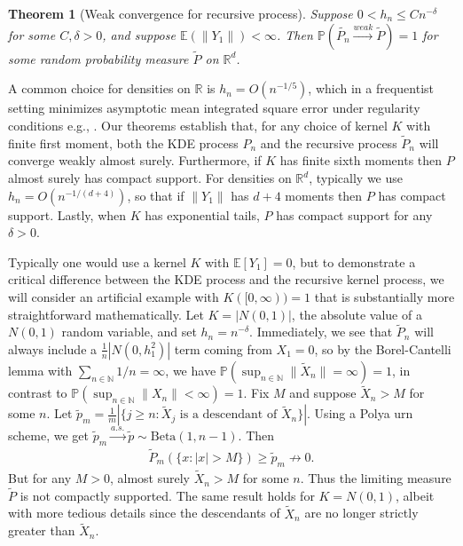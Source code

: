 \documentclass[12pt]{article}
\newtheorem{theorem}{Theorem}
\newcommand{\R}{\mathbb{R}}
\newcommand{\N}{\mathbb{N}}
\newcommand{\E}{\mathbb{E}}
\newcommand{\bP}{\mathbb{P}}
\begin{document}
\begin{theorem}[Weak convergence for recursive process]\label{thm-recursive-conv}
    Suppose $0 < h_n \leq Cn^{-\delta}$ for some $C, \delta > 0$, and suppose $\E(\|Y_1\|) < \infty$. Then $\bP(\tilde{P_n} \overset{weak}{\to} \tilde{P}) = 1$ for some random probability measure $\tilde{P}$ on $\R^d$.
\end{theorem}

A common choice for densities on $\R$ is $h_n = O(n^{-1/5})$, which in a frequentist setting minimizes asymptotic mean integrated square error under regularity conditions e.g., \citet{jones1996brief, silverman2018density}.
Our theorems establish that, for any choice of kernel $K$ with finite first moment, both the KDE process $P_n$ and the recursive process $\tilde{P}_n$ will converge weakly almost surely.
Furthermore, if $K$ has finite sixth moments then $P$ almost surely has compact support.
For densities on $\R^d$, typically we use $h_n = O(n^{-1/(d+4)})$, so that if $\|Y_1\|$ has $d + 4$ moments then $P$ has compact support. Lastly, when $K$ has exponential tails, $P$ has compact support for any $\delta > 0$.

Typically one would use a kernel $K$ with $\E[Y_1] = 0$, but to demonstrate a critical difference between the KDE process and the recursive kernel process, we will consider an artificial example with $K([0, \infty)) = 1$ that is substantially more straightforward mathematically.
Let $K = |N(0, 1)|$, the absolute value of a $N(0, 1)$ random variable, and set $h_n = n^{-\delta}$.
Immediately, we see that $\tilde{P}_n$ will always include a $\frac{1}{n}|N(0, h_1^2)|$ term coming from $X_1 = 0$, so by the Borel-Cantelli lemma with $\sum_{n \in \N} 1/n = \infty$, we have $\bP(\sup_{n \in \N} \|\tilde{X}_n\| = \infty) = 1$, in contrast to $\bP(\sup_{n \in \N} \|X_n\| < \infty) = 1$.
Fix $M$ and suppose $\tilde{X}_n > M$ for some $n$. Let $\tilde{p}_m = \frac{1}{m}|\{j \geq n: \tilde{X}_j \text{ is a descendant of }\tilde{X}_n\}|$. Using a Polya urn scheme, we get $\tilde{p}_m \overset{a.s.}{\to} \tilde{p} \sim \text{Beta}(1, n-1)$. Then
\begin{align*}
    \tilde{P}_m(\{ x: |x| > M\}) \geq \tilde{p}_m \not\to 0.
\end{align*}
But for any $M > 0$, almost surely $\tilde{X}_n > M$ for some $n$. Thus the limiting measure $\tilde{P}$ is not compactly supported. The same result holds for $K = N(0, 1)$, albeit with more tedious details since the descendants of $\tilde{X}_n$ are no longer strictly greater than $\tilde{X}_n$.
\end{document}
